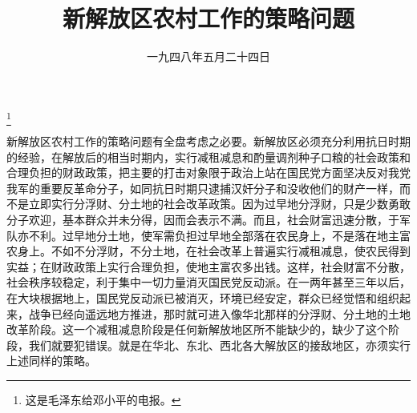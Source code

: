 
\title{新解放区农村工作的策略问题}
\date{一九四八年五月二十四日}
\thanks{这是毛泽东给邓小平的电报。}
\maketitle


新解放区农村工作的策略问题有全盘考虑之必要。新解放区必须充分利用抗日时期的经验，在解放后的相当时期内，实行减租减息和酌量调剂种子口粮的社会政策和合理负担的财政政策，把主要的打击对象限于政治上站在国民党方面坚决反对我党我军的重要反革命分子，如同抗日时期只逮捕汉奸分子和没收他们的财产一样，而不是立即实行分浮财、分土地的社会改革政策。因为过早地分浮财，只是少数勇敢分子欢迎，基本群众并未分得，因而会表示不满。而且，社会财富迅速分散，于军队亦不利。过早地分土地，使军需负担过早地全部落在农民身上，不是落在地主富农身上。不如不分浮财，不分土地，在社会改革上普遍实行减租减息，使农民得到实益；在财政政策上实行合理负担，使地主富农多出钱。这样，社会财富不分散，社会秩序较稳定，利于集中一切力量消灭国民党反动派。在一两年甚至三年以后，在大块根据地上，国民党反动派已被消灭，环境已经安定，群众已经觉悟和组织起来，战争已经向遥远地方推进，那时就可进入像华北那样的分浮财、分土地的土地改革阶段。这一个减租减息阶段是任何新解放地区所不能缺少的，缺少了这个阶段，我们就要犯错误。就是在华北、东北、西北各大解放区的接敌地区，亦须实行上述同样的策略。
